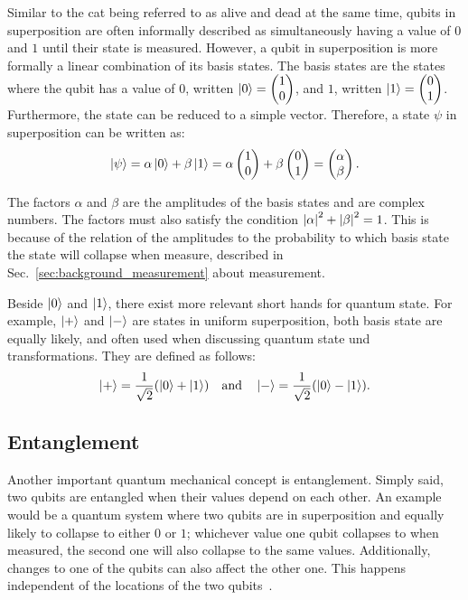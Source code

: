 Similar to the cat being referred to as alive and dead at the same time, qubits in superposition are often informally described as simultaneously having a value of $0$ and $1$ until their state is measured. However, a qubit in superposition is more formally a linear combination of its basis states. The basis states are the states where the qubit has a value of $0$, written $\ket{0} = \begin{pmatrix} 1 \\ 0 \end{pmatrix}$, and $1$, written $\ket{1} = \begin{pmatrix} 0 \\ 1 \end{pmatrix}$.
Furthermore, the state can be reduced to a simple vector. Therefore, a state $\psi$ in superposition can be written as:
\begin{equation*}
    \ket{\psi} = \alpha \ket{0} + \beta \ket{1} = \alpha \begin{pmatrix} 1 \\ 0 \end{pmatrix} + \beta \begin{pmatrix} 0 \\ 1 \end{pmatrix} = \begin{pmatrix} \alpha \\ \beta \end{pmatrix}.
\end{equation*}

The factors $\alpha$ and $\beta$ are the amplitudes of the basis states and are complex numbers. The factors must also satisfy the condition $\abs{\alpha}^2 + \abs{\beta}^2 = 1$. This is because of the relation of the amplitudes to the probability to which basis state the state will collapse when measure, described in Sec.~\ref{sec:background_measurement} about measurement.

Beside $\ket{0}$ and $\ket{1}$, there exist more relevant short hands for quantum state. For example, $\ket{+}$ and $\ket{-}$ are states in uniform superposition, \ie both basis state are equally likely, and often used when discussing quantum state und transformations. They are defined as follows:
\begin{equation*}
    \ket{+} = \frac{1}{\sqrt{2}} (\ket{0} + \ket{1}) \quad  \text{and}  \quad \ket{-} = \frac{1}{\sqrt{2}} (\ket{0} - \ket{1}).
\end{equation*}

\subsection{Entanglement}
\label{sec:background_entanglement}
Another important quantum mechanical concept is entanglement. Simply said, two qubits are entangled when their values depend on each other. An example would be a quantum system where two qubits are in superposition and equally likely to collapse to either $0$ or $1$; whichever value one qubit collapses to when measured, the second one will also collapse to the same values.
Additionally, changes to one of the qubits can also affect the other one. This happens independent of the locations of the two qubits~\cite{RDB*22, HHHH09}.

